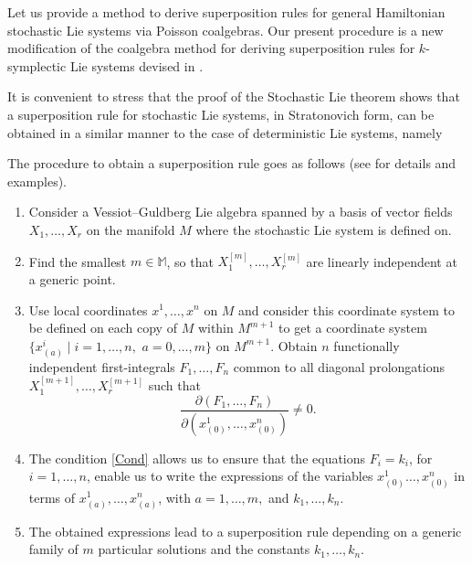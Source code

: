 \documentclass[11pt]{article}
\theoremstyle{plain}
\theoremstyle{definition}
\begin{document}
Let us provide a method to derive superposition rules for general Hamiltonian stochastic Lie systems via Poisson coalgebras. Our present procedure is a new modification of the coalgebra method for deriving superposition rules for $k$-symplectic Lie systems devised in \cite{LV15}. 

It is convenient to stress that the proof of the Stochastic Lie theorem shows that a superposition rule for stochastic Lie systems, in Stratonovich form, can be obtained in a similar manner to the case of deterministic Lie systems, namely
	
	The procedure to obtain a superposition rule goes as follows (see \cite{CGM07,Dissertationes,LS21} for
	details and examples).
	\begin{enumerate}
		\item Consider a Vessiot--Guldberg Lie algebra spanned by a basis of vector fields $X_1,\ldots,X_r$ on the manifold $M$ where the stochastic Lie system is defined on.
  \item Find the smallest  $m\in \mathbb{M}$, so that $X^{[m]}_1,\ldots,X_r^{[m]}$  
		are linearly independent at a generic point.
		\item Use local coordinates $x^1,\ldots,x^n$ on $M$ and consider this coordinate
		system to be defined on each copy of $M$ within $M^{m+1}$ to get a coordinate system
		$\{x^i_{(a)}\mid i=1,\ldots,n,\,\,a=0,\ldots,m\}$ on $M^{m+1}$.
		Obtain $n$ functionally independent first-integrals $F_1,\ldots, F_n$ common to all diagonal prolongations
		$X^{[m+1]}_1,\ldots,  X^{[m+1]}_r$ such that 
		\begin{equation}\label{Cond}
		\frac{\partial(F_1,\ldots,F_n)}{\partial(x_{(0)}^1,\ldots,x_{(0)}^n)}\neq 0.
		\end{equation}
		  
		\item 
	    The condition \eqref{Cond} allows us to ensure that the equations $F_i=k_i$, for $i=1,\ldots,n$, enable us to write the expressions of the variables $x_{(0)}^1\ldots,x_{(0)}^n$ in
		terms of $x^1_{(a)},\ldots,x_{(a)}^n$, with $a=1,\ldots,m,$  and $k_1,\ldots,k_n$.
		\item The obtained expressions lead to a superposition rule depending on a generic family of $m$ particular solutions
		and the constants $k_1,\ldots, k_n$.  
	\end{enumerate}
\end{document}
